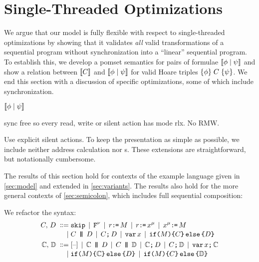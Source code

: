 \section{Single-Threaded Optimizations}
\label{sec:opt}

We argue that our model is fully flexible with respect to single-threaded
optimizations by showing that it validates {\em all} valid transformations of
a sequential program without synchronization into a ``linear'' sequential
program.  To establish this, we develop a pomset semantics for pairs of
formulae $\llbracket\phi\mid\psi\rrbracket$ and show a relation between $\llbracket C\rrbracket$
and $\llbracket\phi\mid\psi\rrbracket$ for valid Hoare triples
$\{\phi\}\allowbreak\;C\;\allowbreak\{\psi\}$.  We end this section with a discussion of
specific optimizations, some of which include synchronization.

\begin{math}
  \llbracket\phi\mid\psi\rrbracket
\end{math}


sync free so every read, write or silent action has mode rlx.  No RMW.


Use explicit silent actions.
    To keep the presentation as simple as possible, we include neither address
calculation nor \RMW{}s.  These extensions are straightforward, but
notationally cumbersome.

The results of this section hold for contexts of the example language
given in \textsection\ref{sec:model} and extended in \textsection\ref{sec:variants}.
The results also hold for the more general contexts of
\textsection\ref{sec:semicolon}, which includes full sequential composition:


We refactor the syntax:
\begin{align*}
  \aCmd,\,\bCmd
  \BNFDEF& \SKIP
  \mkern-2mu\BNFSEP\mkern-2mu \FENCE^{\fmode}
  \mkern-2mu\BNFSEP\mkern-2mu \aReg\GETS\aExp
  \mkern-2mu\BNFSEP\mkern-2mu \aReg\GETS\aLoc^{\amode} 
  \mkern-2mu\BNFSEP\mkern-2mu \aLoc^{\amode}\GETS\aExp
  \\[-.5ex]
  \BNFSEP&\aCmd \PAR \bCmd
  \mkern-2mu\BNFSEP\mkern-2mu\aCmd \SEMI \bCmd
  \mkern-2mu\BNFSEP\mkern-2mu \VAR\aLoc
  \mkern-2mu\BNFSEP\mkern-2mu \IF{\aExp} \THEN \aCmd \ELSE \bCmd \FI
  \\
  \aCtxt,\,\bCtxt
  \BNFDEF& \hole{}
  \mkern-2mu\BNFSEP\mkern-2mu \aCtxt \PAR \bCmd
  \mkern-2mu\BNFSEP\mkern-2mu \aCmd \PAR \bCtxt
  \mkern-2mu\BNFSEP\mkern-2mu \aCtxt \SEMI \bCmd
  \mkern-2mu\BNFSEP\mkern-2mu \aCmd \SEMI \bCtxt
  \mkern-2mu\BNFSEP\mkern-2mu \VAR\aLoc\SEMI \aCtxt
  \\[-.5ex]
  \BNFSEP& \IF{\aExp} \THEN \aCtxt \ELSE \bCmd \FI
  \mkern-2mu\BNFSEP\mkern-2mu \IF{\aExp} \THEN \aCmd \ELSE \bCtxt \FI
\end{align*}

